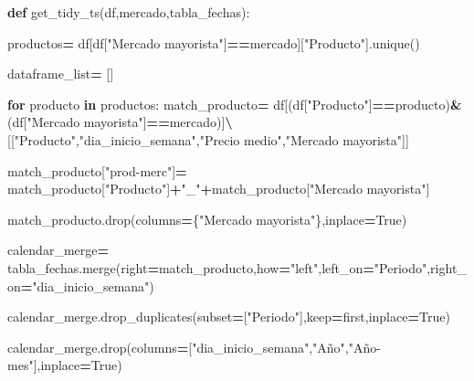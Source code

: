 \documentclass[
]{book}
\newenvironment{Shaded}{\begin{snugshade}}{\end{snugshade}}
\newcommand{\ControlFlowTok}[1]{\textcolor[rgb]{0.13,0.29,0.53}{\textbf{#1}}}
\newcommand{\KeywordTok}[1]{\textcolor[rgb]{0.13,0.29,0.53}{\textbf{#1}}}
\newcommand{\NormalTok}[1]{#1}
\newcommand{\OperatorTok}[1]{\textcolor[rgb]{0.81,0.36,0.00}{\textbf{#1}}}
\newcommand{\StringTok}[1]{\textcolor[rgb]{0.31,0.60,0.02}{#1}}
\newcommand{\VariableTok}[1]{\textcolor[rgb]{0.00,0.00,0.00}{#1}}
\begin{document}
\begin{Shaded}
\begin{Highlighting}[]

\KeywordTok{def}\NormalTok{ get\_tidy\_ts(df,mercado,tabla\_fechas):}
    
\NormalTok{    productos}\OperatorTok{=}\NormalTok{ df[df[}\StringTok{"Mercado mayorista"}\NormalTok{]}\OperatorTok{==}\NormalTok{mercado][}\StringTok{"Producto"}\NormalTok{].unique()}
    
\NormalTok{    dataframe\_list}\OperatorTok{=}\NormalTok{ []}
    
           
    
    \ControlFlowTok{for}\NormalTok{ producto }\KeywordTok{in}\NormalTok{ productos:}
\NormalTok{         match\_producto}\OperatorTok{=}\NormalTok{ df[(df[}\StringTok{"Producto"}\NormalTok{]}\OperatorTok{==}\NormalTok{producto)}\OperatorTok{\&}\NormalTok{(df[}\StringTok{"Mercado mayorista"}\NormalTok{]}\OperatorTok{==}\NormalTok{mercado)]}\OperatorTok{\textbackslash{}}
\NormalTok{                                        [[}\StringTok{"Producto"}\NormalTok{,}\StringTok{"dia\_inicio\_semana"}\NormalTok{,}\StringTok{"Precio medio"}\NormalTok{,}\StringTok{"Mercado mayorista"}\NormalTok{]]}
         
\NormalTok{         match\_producto[}\StringTok{"prod{-}merc"}\NormalTok{]}\OperatorTok{=}\NormalTok{ match\_producto[}\StringTok{"Producto"}\NormalTok{]}\OperatorTok{+}\StringTok{"\_"}\OperatorTok{+}\NormalTok{match\_producto[}\StringTok{"Mercado mayorista"}\NormalTok{]}
         
\NormalTok{         match\_producto.drop(columns}\OperatorTok{=}\NormalTok{\{}\StringTok{"Mercado mayorista"}\NormalTok{\},inplace}\OperatorTok{=}\VariableTok{True}\NormalTok{)}
         
\NormalTok{         calendar\_merge}\OperatorTok{=}\NormalTok{ tabla\_fechas.merge(right}\OperatorTok{=}\NormalTok{match\_producto,how}\OperatorTok{=}\StringTok{"left"}\NormalTok{,left\_on}\OperatorTok{=}\StringTok{"Periodo"}\NormalTok{,right\_on}\OperatorTok{=}\StringTok{"dia\_inicio\_semana"}\NormalTok{)}
         
\NormalTok{         calendar\_merge.drop\_duplicates(subset}\OperatorTok{=}\NormalTok{[}\StringTok{"Periodo"}\NormalTok{],keep}\OperatorTok{=}\StringTok{\textquotesingle{}first\textquotesingle{}}\NormalTok{,inplace}\OperatorTok{=}\VariableTok{True}\NormalTok{)}
         
         
\NormalTok{         calendar\_merge.drop(columns}\OperatorTok{=}\NormalTok{[}\StringTok{"dia\_inicio\_semana"}\NormalTok{,}\StringTok{"Año"}\NormalTok{,}\StringTok{"Año{-}mes"}\NormalTok{],inplace}\OperatorTok{=}\VariableTok{True}\NormalTok{)}
         

\end{Highlighting}
\end{Shaded}
\end{document}
